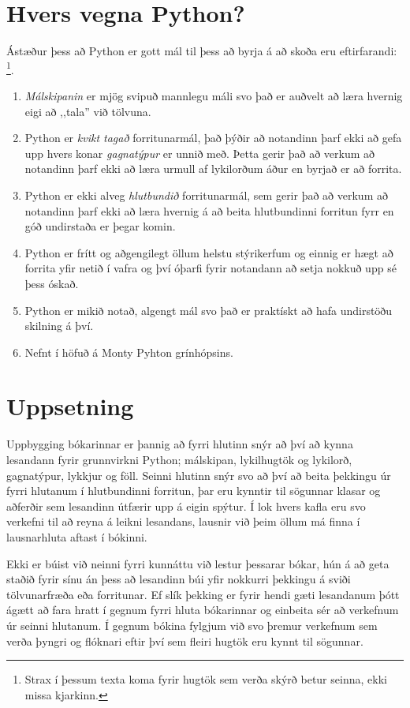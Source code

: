 \section{Hvers vegna Python?}

Ástæður þess að Python er gott mál til þess að byrja á að skoða eru eftirfarandi: \footnote{Strax í þessum texta koma fyrir hugtök sem verða skýrð betur seinna, ekki missa kjarkinn.}.

\begin{enumerate}
	\item \textit{Málskipanin} er mjög svipuð mannlegu máli svo það er auðvelt að læra hvernig eigi að ,,tala'' við tölvuna.
	\item  Python er \textit{kvikt tagað} forritunarmál, það þýðir að notandinn þarf ekki að gefa upp hvers konar \textit{gagnatýpur} er unnið með. 
	Þetta gerir það að verkum að notandinn þarf ekki að læra urmull af lykilorðum áður en byrjað er að forrita.
	\item  Python er ekki alveg \textit{hlutbundið} forritunarmál, sem gerir það að verkum að notandinn þarf ekki að læra hvernig á að beita hlutbundinni forritun fyrr en góð undirstaða er þegar komin.
	\item Python er frítt og aðgengilegt öllum helstu stýrikerfum og einnig er hægt að forrita yfir netið í vafra og því óþarfi fyrir notandann að setja nokkuð upp sé þess óskað.
	\item Python er mikið notað, algengt mál svo það er praktískt að hafa undirstöðu skilning á því.
	\item Nefnt í höfuð á Monty Pyhton grínhópsins.
\end{enumerate}

\section{Uppsetning}
Uppbygging bókarinnar er þannig að fyrri hlutinn snýr að því að kynna lesandann fyrir grunnvirkni Python; málskipan, lykilhugtök og lykilorð, gagnatýpur, lykkjur og föll.
Seinni hlutinn snýr svo að því að beita þekkingu úr fyrri hlutanum í hlutbundinni forritun, þar eru kynntir til sögunnar klasar og aðferðir sem lesandinn útfærir upp á eigin spýtur.
Í lok hvers kafla eru svo verkefni til að reyna á leikni lesandans, lausnir við þeim öllum má finna í lausnarhluta aftast í bókinni.

Ekki er búist við neinni fyrri kunnáttu við lestur þessarar bókar, hún á að geta staðið fyrir sínu án þess að lesandinn búi yfir nokkurri þekkingu á sviði tölvunarfræða eða forritunar.
Ef slík þekking er fyrir hendi gæti lesandanum þótt ágætt að fara hratt í gegnum fyrri hluta bókarinnar og einbeita sér að verkefnum úr seinni hlutanum.
Í gegnum bókina fylgjum við svo þremur verkefnum sem verða þyngri og flóknari eftir því sem fleiri hugtök eru kynnt til sögunnar. 

